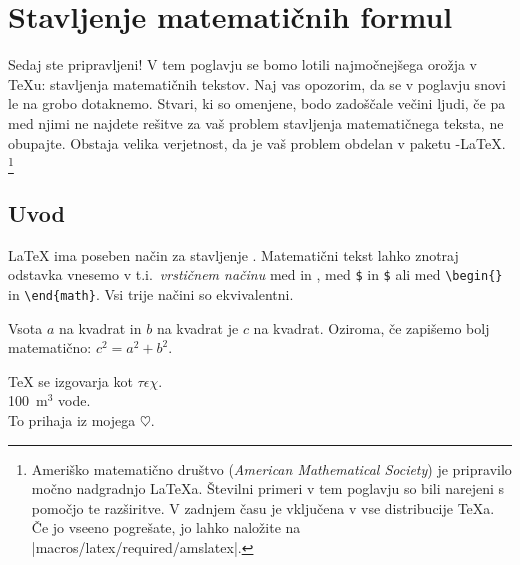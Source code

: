  
\chapter{Stavljenje matematičnih formul}

\begin{intro}
  Sedaj ste pripravljeni! V tem poglavju se bomo lotili najmočnejšega orožja v
  \TeX{}u: stavljenja matematičnih tekstov. Naj vas opozorim, da se v poglavju
  snovi le na grobo dotaknemo. Stvari, ki so omenjene, bodo 
  zadoščale večini ljudi, če pa med njimi ne najdete rešitve
  za vaš problem stavljenja matematičnega teksta, ne obupajte.
  Obstaja velika verjetnost, da je vaš problem obdelan v 
  paketu \AmS-\LaTeX{}.%
  \footnote{Ameriško matematično društvo (\emph{American Mathematical Society})
  je pripravilo močno nadgradnjo \LaTeX{}a. Številni primeri 
  v tem poglavju so bili narejeni s pomočjo te razširitve.
  V zadnjem času je vključena v vse distribucije 
  \TeX{}a. Če jo vseeno pogrešate, jo lahko naložite na \CTANref|macros/latex/required/amslatex|.}
\end{intro}
 
\section{Uvod}

\LaTeX{} ima poseben način za stavljenje .
Matematični tekst lahko 
znotraj odstavka vnesemo v t.i.~\emph{vrstičnem načinu} med \ci{(}
in \ci{)},  %
med \texttt{\$} in \texttt{\$} ali med %
\verb|\begin{|\verb|}| in \verb|\end{math}|.
Vsi trije načini so ekvivalentni.
\begin{example}
Vsota $a$ na kvadrat in $b$ na 
kvadrat je $c$ na kvadrat. Oziroma, 
če zapišemo bolj matematično:
\(c^{2}=a^{2}+b^{2}\).
\end{example}
\begin{example}
\TeX{} se izgovarja kot
$\tau\epsilon\chi$.\\[6pt]
100~m$^{3}$ vode.\\[6pt]
To prihaja iz mojega $\heartsuit$.
\end{example}

